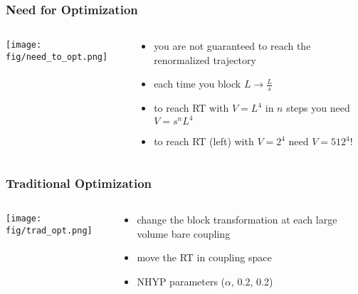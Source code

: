 \documentclass{beamer}
\begin{document}
  \begin{frame}
    \frametitle{Need for Optimization}
    \begin{columns}[T]
      \begin{column}{.5\textwidth}
        \begin{block}{}
          \texttt{[image: fig/need\_to\_opt.png]}
        \end{block}
      \end{column}
      \begin{column}{.5\textwidth}
        \begin{block}{}
          \begin{itemize}
            \item you are not guaranteed to reach the renormalized trajectory
            \item each time you block $L\rightarrow\frac{L}{s}$
            \item to reach RT with $V=L^4$ in $n$ steps you need $V=s^nL^{4}$
            \item to reach RT (left) with $V=2^4$ need $V=512^4$!
          \end{itemize}
        \end{block}
      \end{column}
    \end{columns}
  \end{frame}

  \begin{frame}
    \frametitle{Traditional Optimization}
    \begin{columns}[T]
      \begin{column}{.5\textwidth}
        \begin{block}{}
          \texttt{[image: fig/trad\_opt.png]}
        \end{block}
      \end{column}
      \begin{column}{.5\textwidth}
        \begin{block}{}
          \begin{itemize}
            \item change the block transformation at each large volume bare coupling
            \item move the RT in coupling space
            \item NHYP parameters ($\alpha$, 0.2, 0.2)
          \end{itemize}
        \end{block}
      \end{column}
    \end{columns}
  \end{frame}
\end{document}
